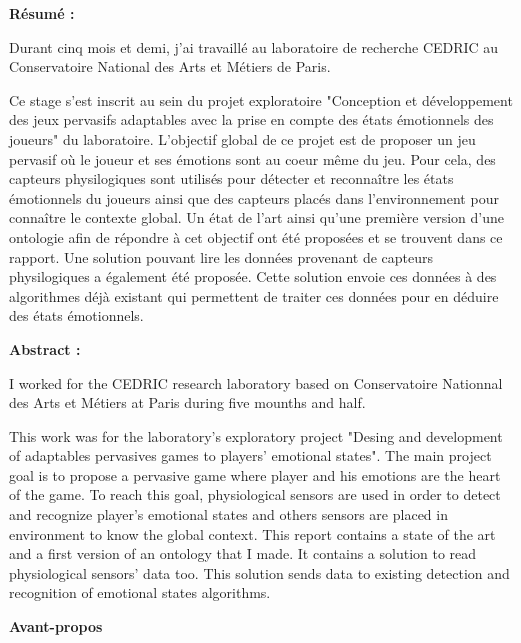 \documentclass{article}
\begin{document}
\newpage
\begin{center}
	\textbf{Résumé :}
\end{center}
\hspace*{0.4cm}
Durant cinq mois et demi, j'ai travaillé au laboratoire de recherche CEDRIC au Conservatoire National des Arts et Métiers de Paris.\par
Ce stage s'est inscrit au sein du projet exploratoire "Conception et développement des jeux pervasifs adaptables avec la prise en compte des états émotionnels des joueurs" du laboratoire.
L'objectif global de ce projet est de proposer un jeu pervasif où le joueur et ses émotions sont au coeur même du jeu. 
Pour cela, des capteurs physilogiques sont utilisés pour détecter et reconnaître les états émotionnels du joueurs ainsi que des capteurs placés dans l'environnement pour connaître le contexte global. 
Un état de l'art ainsi qu'une première version d'une ontologie afin de répondre à cet objectif ont été proposées et se trouvent dans ce rapport. 
Une solution pouvant lire les données provenant de capteurs physilogiques a également été proposée.
Cette solution envoie ces données à des algorithmes déjà existant qui permettent de traiter ces données pour en déduire des états émotionnels.
\bigskip\newline
\begin{center}
	\textbf{Abstract :}
\end{center}
\hspace*{0.4cm}
I worked for the CEDRIC research laboratory based on Conservatoire Nationnal des Arts et Métiers at Paris during five mounths and half.\par
This work was for the laboratory's exploratory project "Desing and development of adaptables pervasives games to players' emotional states".
The main project goal is to propose a pervasive game where player and his emotions are the heart of the game.
To reach this goal, physiological sensors are used in order to detect and recognize player's emotional states and others sensors are placed in environment to know the global context.
This report contains a state of the art and a first version of an ontology that I made. 
It contains a solution to read physiological sensors' data too.
This solution sends data to existing detection and recognition of emotional states algorithms.
\vspace*{4cm}
\begin{center}
	\textbf{Avant-propos}
\end{center}
\hspace*{0.4cm}
\end{document}
